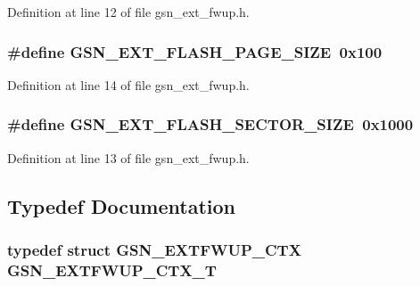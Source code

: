 Definition at line 12 of file gsn\_\-ext\_\-fwup.h.

\hypertarget{a00498_a4accdf7cd930cf0f67d1023488e4cf0b}{
\subsubsection[{GSN\_\-EXT\_\-FLASH\_\-PAGE\_\-SIZE}]{\setlength{\rightskip}{0pt plus 5cm}\#define GSN\_\-EXT\_\-FLASH\_\-PAGE\_\-SIZE~0x100}}
\label{a00498_a4accdf7cd930cf0f67d1023488e4cf0b}


Definition at line 14 of file gsn\_\-ext\_\-fwup.h.

\hypertarget{a00498_a86beb90de698b83fc2a4799ada726c35}{
\subsubsection[{GSN\_\-EXT\_\-FLASH\_\-SECTOR\_\-SIZE}]{\setlength{\rightskip}{0pt plus 5cm}\#define GSN\_\-EXT\_\-FLASH\_\-SECTOR\_\-SIZE~0x1000}}
\label{a00498_a86beb90de698b83fc2a4799ada726c35}


Definition at line 13 of file gsn\_\-ext\_\-fwup.h.



\subsection{Typedef Documentation}
\hypertarget{a00498_ac6615802399bc0ad64b060c05fa3e561}{
\subsubsection[{GSN\_\-EXTFWUP\_\-CTX\_\-T}]{\setlength{\rightskip}{0pt plus 5cm}typedef struct {\bf GSN\_\-EXTFWUP\_\-CTX} {\bf GSN\_\-EXTFWUP\_\-CTX\_\-T}}}
\label{a00498_ac6615802399bc0ad64b060c05fa3e561}


